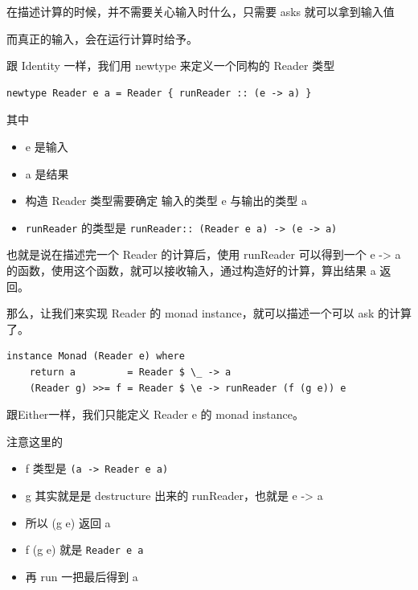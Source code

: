 \documentclass[11pt]{tufte-book}
\begin{document}
在描述计算的时候，并不需要关心输入时什么，只需要 asks 就可以拿到输入值

而真正的输入，会在运行计算时给予。

跟 Identity 一样，我们用 newtype 来定义一个同构的 Reader 类型
\begin{verbatim}
newtype Reader e a = Reader { runReader :: (e -> a) }
\end{verbatim}

其中
\begin{itemize}
\item e 是输入
\item a 是结果
\item 构造 Reader 类型需要确定 输入的类型 e 与输出的类型 a
\item \texttt{runReader} 的类型是 \texttt{runReader:: (Reader e a) -> (e -> a)}
\end{itemize}

也就是说在描述完一个 Reader 的计算后，使用 runReader 可以得到一个 e -> a 的函数，使用这个函数，就可以接收输入，通过构造好的计算，算出结果 a 返回。

那么，让我们来实现 Reader 的 monad instance，就可以描述一个可以 ask 的计算了。

\begin{verbatim}
instance Monad (Reader e) where
    return a         = Reader $ \_ -> a
    (Reader g) >>= f = Reader $ \e -> runReader (f (g e)) e
\end{verbatim}

跟Either一样，我们只能定义 Reader e 的 monad instance。

注意这里的
\begin{itemize}
\item f 类型是 \texttt{(a -> Reader e a)}
\item g 其实就是是 destructure 出来的 runReader，也就是 e -> a
\item 所以 (g e) 返回 a
\item f (g e) 就是 \texttt{Reader e a}
\item 再 run 一把最后得到 a
\end{itemize}
\end{document}
